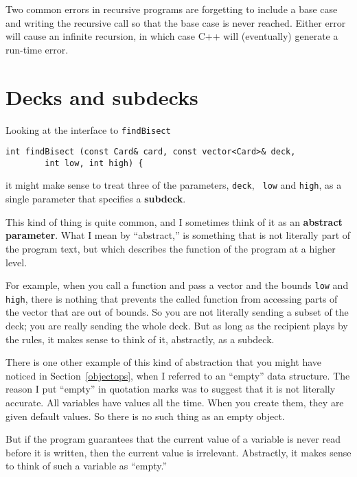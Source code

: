 Two common errors in recursive programs are forgetting to include a
base case and writing the recursive call so that the base case is never
reached.  Either error will cause an infinite recursion, in which case
C++ will (eventually) generate a run-time error.


\section{Decks and subdecks}

Looking at the interface to {\tt findBisect}

\begin{verbatim}
int findBisect (const Card& card, const vector<Card>& deck,
		int low, int high) {
\end{verbatim}
%
it might make sense to treat three of the parameters, {\tt deck}, {\tt
low} and {\tt high}, as a single parameter that specifies a {\bf
subdeck}.


This kind of thing is quite common, and I sometimes think of it as an
{\bf abstract parameter}.  What I mean by ``abstract,'' is something
that is not literally part of the program text, but which describes the
function of the program at a higher level.

For example, when you call a function and pass a vector and the bounds
{\tt low} and {\tt high}, there is nothing that prevents the called
function from accessing parts of the vector that are out of bounds.  So
you are not literally sending a subset of the deck; you are really
sending the whole deck.  But as long as the recipient plays by the
rules, it makes sense to think of it, abstractly, as a subdeck.

There is one other example of this kind of abstraction that you might
have noticed in Section~\ref{objectops}, when I referred to an
``empty'' data structure.  The reason I put ``empty'' in quotation
marks was to suggest that it is not literally accurate.  All variables
have values all the time.  When you create them, they are given
default values.  So there is no such thing as an empty object.

But if the program guarantees that the current value of a variable is
never read before it is written, then the current value is irrelevant.
Abstractly, it makes sense to think of such a variable as ``empty.''

